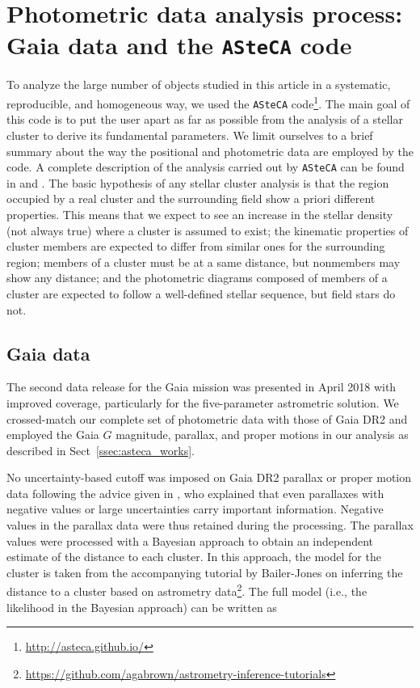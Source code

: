 \documentclass[draft]{aa}
\begin{document}
\section{Photometric data analysis process: Gaia data and the \texttt{ASteCA}
code}
\label{sec:photom_analysis}

To analyze the large number of objects studied in this article in a systematic,
reproducible, and homogeneous way, we used the \texttt{ASteCA}
code\footnote{\url{http://asteca.github.io/}}. The main goal of this code is to
put the user apart as far as possible from the analysis of a stellar cluster
to derive its fundamental parameters. We limit ourselves to a brief
summary about the way the positional and photometric data are employed by the
code. A complete description of the analysis carried out by
\texttt{ASteCA} can be found in \cite{Perren_2015} and \cite{Perren_2017}.
%
The basic hypothesis of any stellar cluster analysis is that the
region occupied by a real cluster and the surrounding field show a
priori different properties.
This means that we expect to see an increase in the stellar density  (not always true) where
a cluster is assumed to exist; the kinematic properties of cluster members
are expected to differ from similar ones for the surrounding region; members of a
cluster must be at a same distance, but nonmembers may show any
distance; and the photometric diagrams composed of members of a cluster are expected to
follow a well-defined stellar sequence, but field stars do not. 



\subsection{Gaia data}
\label{ssec:gaia_data}

The second data release for the Gaia mission \citep{GaiaDR2_2018} was presented
in April 2018 with improved coverage, particularly for the five-parameter
astrometric solution.
We crossed-match our complete set of photometric data with those of Gaia DR2
and employed the Gaia $G$ magnitude, parallax, and proper motions in our
analysis as described in Sect~\ref{ssec:asteca_works}.

No uncertainty-based cutoff was imposed on Gaia DR2 parallax or proper
motion data following the advice given in \cite{Luri_2018}, who explained that even parallaxes with negative values or large
uncertainties carry important information. Negative values in the parallax
data were thus retained during the processing. The parallax values
were processed with a Bayesian approach to obtain an independent estimate of the
distance to each cluster. In this approach, the model for the cluster is
taken from the accompanying tutorial by Bailer-Jones on inferring the distance
to a cluster based on astrometry
data\footnote{
\url{https://github.com/agabrown/astrometry-inference-tutorials}}.
The full model (i.e., the likelihood in the Bayesian approach) can be
written as
\end{document}

